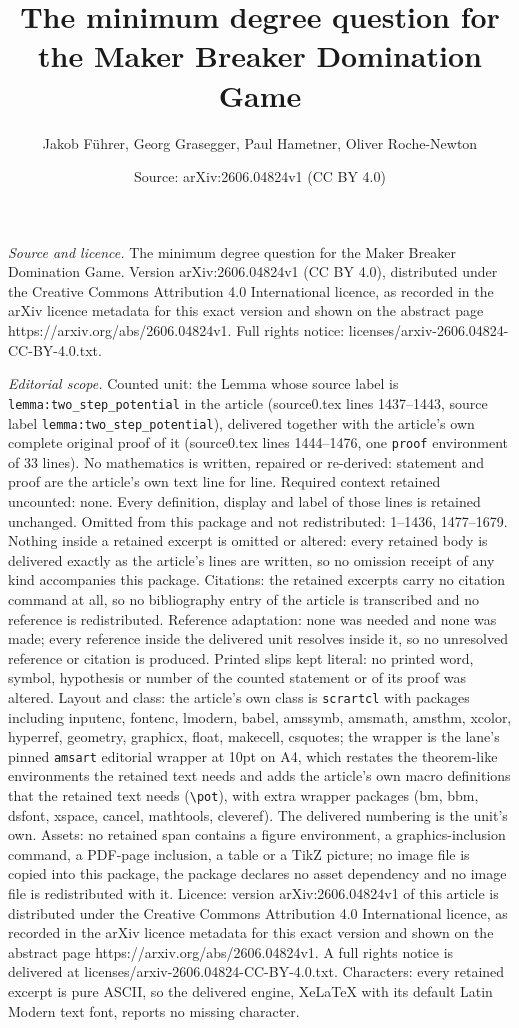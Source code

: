 \documentclass[10pt,a4paper]{amsart}
\title[The minimum degree question for the Maker Breaker Domination]{The minimum degree question for the Maker Breaker Domination Game}
\author{Jakob F\"uhrer, Georg Grasegger, Paul Hametner, Oliver Roche-Newton}
\date{Source: arXiv:2606.04824v1 (CC BY 4.0)}
\begin{document}
\maketitle

\noindent\emph{Source and licence.} The minimum degree question for the Maker Breaker Domination Game. Version arXiv:2606.04824v1 (CC BY 4.0), distributed under the Creative Commons Attribution 4.0 International licence, as recorded in the arXiv licence metadata for this exact version and shown on the abstract page https://arxiv.org/abs/2606.04824v1. Full rights notice: licenses/arxiv-2606.04824-CC-BY-4.0.txt.\par\smallskip

\noindent\textit{Editorial scope.} Counted unit: the Lemma whose source label is \texttt{lemma:two\_step\_potential} in the article (source0.tex lines 1437--1443, source label \texttt{lemma:two\_step\_potential}), delivered together with the article's own complete original proof of it (source0.tex lines 1444--1476, one \texttt{proof} environment of 33 lines). No mathematics is written, repaired or re-derived: statement and proof are the article's own text line for line. Required context retained uncounted: none. Every definition, display and label of those lines is retained unchanged. Omitted from this package and not redistributed: 1--1436, 1477--1679. Nothing inside a retained excerpt is omitted or altered: every retained body is delivered exactly as the article's lines are written, so no omission receipt of any kind accompanies this package. Citations: the retained excerpts carry no citation command at all, so no bibliography entry of the article is transcribed and no reference is redistributed. Reference adaptation: none was needed and none was made; every reference inside the delivered unit resolves inside it, so no unresolved reference or citation is produced. Printed slips kept literal: no printed word, symbol, hypothesis or number of the counted statement or of its proof was altered. Layout and class: the article's own class is \texttt{scrartcl} with packages including inputenc, fontenc, lmodern, babel, amssymb, amsmath, amsthm, xcolor, hyperref, geometry, graphicx, float, makecell, csquotes; the wrapper is the lane's pinned \texttt{amsart} editorial wrapper at 10pt on A4, which restates the theorem-like environments the retained text needs and adds the article's own macro definitions that the retained text needs (\texttt{\textbackslash pot}), with extra wrapper packages (bm, bbm, dsfont, xspace, cancel, mathtools, cleveref). The delivered numbering is the unit's own. Assets: no retained span contains a figure environment, a graphics-inclusion command, a PDF-page inclusion, a table or a TikZ picture; no image file is copied into this package, the package declares no asset dependency and no image file is redistributed with it. Licence: version arXiv:2606.04824v1 of this article is distributed under the Creative Commons Attribution 4.0 International licence, as recorded in the arXiv licence metadata for this exact version and shown on the abstract page https://arxiv.org/abs/2606.04824v1. A full rights notice is delivered at licenses/arxiv-2606.04824-CC-BY-4.0.txt. Characters: every retained excerpt is pure ASCII, so the delivered engine, XeLaTeX with its default Latin Modern text font, reports no missing character.
\end{document}
